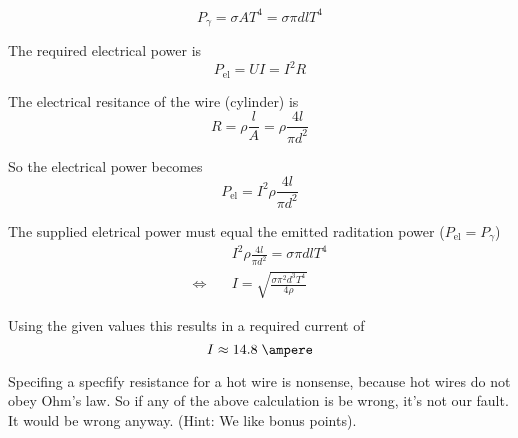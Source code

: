 \documentclass[a4paper,german,12pt,smallheadings]{scrartcl}
\begin{document}
\begin{enumerate}[a)]
    \begin{equation*}
      P_\gamma = \sigma A T^4 = \sigma \pi d l T^4
    \end{equation*}

    The required electrical power is
    \begin{equation*}
      P_\text{el} = UI = I^2R
    \end{equation*}

    The electrical resitance of the wire (cylinder) is
    \begin{equation*}
      R = \rho \frac{l}{A} = \rho \frac{4l}{\pi d^2}
    \end{equation*}

    So the electrical power becomes
    \begin{equation*}
      P_\text{el} = I^2 \rho \frac{4l}{\pi d^2}
    \end{equation*}

    The supplied eletrical power must equal the emitted raditation power ($P_\text{el} = P_\gamma$)
    \begin{align*}
      &\quad I^2 \rho \frac{4l}{\pi d^2} = \sigma \pi d l T^4 \\
      \Leftrightarrow&\quad I = \sqrt{\frac{\sigma \pi^2 d^3 T^4}{4 \rho}}
    \end{align*}

    Using the given values this results in a required current of
    \begin{equation*}
      I \approx 14.8 \; \ampere
    \end{equation*}

    Specifing a specfify resistance for a hot wire is nonsense, because hot
    wires do not obey Ohm's law. So if any of the above calculation is be
    wrong, it's not our fault. It would be wrong anyway. (Hint: We like bonus
    points).
\end{enumerate}
\end{document}
